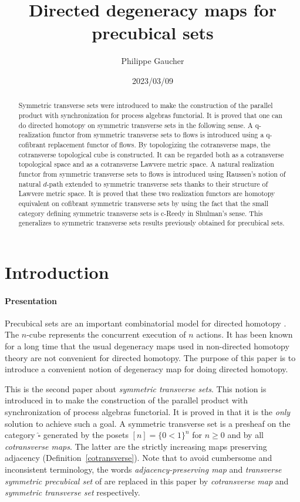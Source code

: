 \documentclass[a4paper,12pt]{amsart}
\title{Directed degeneracy maps for precubical sets}
\author[P. Gaucher]{Philippe Gaucher}
\date{2023/03/09}
\theoremstyle{definition}
\renewcommand{\geq}{\geqslant}
\begin{document}
	
	
\begin{abstract}
	Symmetric transverse sets were introduced to make the construction of the parallel product with synchronization for process algebras functorial. It is proved that one can do directed homotopy on symmetric transverse sets in the following sense. A q-realization functor from symmetric transverse sets to flows is introduced using a q-cofibrant replacement functor of flows. By topologizing the cotransverse maps, the cotransverse topological cube is constructed. It can be regarded both as a cotransverse topological space and as a cotransverse Lawvere metric space.   A natural realization functor from symmetric transverse sets to flows is introduced using Raussen's notion of natural $d$-path extended to symmetric transverse sets thanks to their structure of Lawvere metric space. It is proved that these two realization functors are homotopy equivalent on cofibrant symmetric transverse sets by using the fact that the small category defining symmetric transverse sets is c-Reedy in Shulman's sense. This generalizes to symmetric transverse sets results previously obtained for precubical sets. 
\end{abstract}
	
\maketitle
\setcounter{tocdepth}{1}
\tableofcontents
\hypersetup{linkcolor = dark-red}

\part*{Introduction}

\subsection*{Presentation}

Precubical sets are an important combinatorial model for directed homotopy \cite{DAT_book}. The $n$-cube represents the concurrent execution of $n$ actions. It has been known for a long time that the usual degeneracy maps used in non-directed homotopy theory are not convenient for directed homotopy. The purpose of this paper is to introduce a convenient notion of degeneracy map for doing directed homotopy. 

This is the second paper about \textit{symmetric transverse sets}. This notion is introduced in \cite{symcub} to make the construction of the parallel product with synchronization of process algebras functorial. It is proved in \cite[Theorem 3.1.15]{symcub} that it is the \textit{only} solution to achieve such a goal. A symmetric transverse set is a presheaf on the category $\widehat{\square}$ generated by the posets $[n]=\{0<1\}^n$ for $n\geq 0$ and by all \textit{cotransverse maps}. The latter are the strictly increasing maps preserving adjacency (Definition~\ref{cotransverse}). Note that to avoid cumbersome and inconsistent terminology, the words \textit{adjacency-preserving map} and \textit{transverse symmetric precubical set} of \cite{symcub} are replaced in this paper by \textit{cotransverse map} and \textit{symmetric transverse set} respectively. 
\end{document}
